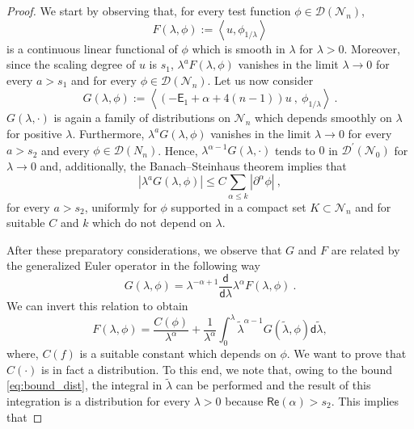 \documentclass[11pt]{book}
\renewcommand{\Re}{\mathsf{Re}}
\newcommand{\abs}[1]{\left|#1\right|}
\newcommand{\sm}[1]{\left\langle#1\right\rangle}
\newcommand{\Dcal}{\mathcal{D}}
\newcommand{\Ncal}{\mathcal{N}}
\newcommand{\Esf}{\mathsf{E}}
\newcommand{\dsf}{\mathsf{d}}
\theoremstyle{break}
\begin{document}
\begin{proof}
We start by observing that, for every test function $\phi\in\Dcal(\Ncal_n)$, 
%
\begin{equation*}
F(\lambda, \phi) := \sm{ u, \phi_{1/\lambda} } 
\end{equation*}
% 
is a continuous linear functional of $\phi$ which is smooth in $\lambda$ for $\lambda>0$. Moreover, since the scaling degree of $u$ is $s_1$, $\lambda^{a} F(\lambda, \phi)$ vanishes in the limit $\lambda \to 0$ for every $a > s_1$ and for every $\phi\in\Dcal(\Ncal_n)$. Let us now consider 
%
\begin{equation*}
G(\lambda, \phi) :=  \sm{\left(- \Esf_1+\alpha+4(n-1)\right) u \ , \ \phi_{1/\lambda} } \ .
\end{equation*}
%
$G(\lambda, \cdot)$ is again a family of distributions on $\Ncal_n$ which depends smoothly on $\lambda$ for positive $\lambda$. Furthermore, $\lambda^a G(\lambda, \phi)$ vanishes in the limit $\lambda \to 0$ for every $a > s_2$ and every $\phi\in\Dcal(N_n)$. Hence, $\lambda^{\alpha-1} G(\lambda, \cdot)$ tends to $0$ in $\Dcal^\prime(\Ncal_0)$ for $\lambda\to 0$ and, additionally, the Banach--Steinhaus theorem \cite{BOURBAKI_1987} implies that 
%
\begin{equation}
\abs{ \lambda^a G(\lambda,\phi) }  \leq C \sum_{\alpha\leq k} \abs{\partial^{\alpha} \phi} \ ,
\label{eq:bound_dist}
\end{equation}
%
for every $a>s_2$, uniformly for $\phi$ supported in a compact set $K\subset \Ncal_n$ and for suitable $C$ and $k$ which do not depend on $\lambda$.\par%
%
After these preparatory considerations, we observe that $G$ and $F$ are related by the generalized Euler operator in the following way
%
\begin{equation*}
G(\lambda, \phi) =  \lambda^{-\alpha+1} \frac{\dsf}{\dsf\lambda} \lambda^{\alpha} F(\lambda, \phi) \ . 
\end{equation*}
%
We can invert this relation to obtain
%
\begin{equation*}
F(\lambda, \phi) =  \frac{C(\phi)}{\lambda^{\alpha}} + \frac{1}{\lambda^\alpha} \int_0^\lambda  \tilde{\lambda}^{\alpha-1} G(\tilde{\lambda}, \phi) \dsf\tilde{\lambda}, 
\end{equation*}
%
where, $C(f)$ is a suitable constant which depends on $\phi$. We want to prove that $C(\cdot)$ is in fact a distribution. To this end, we note that, owing to the bound \eqref{eq:bound_dist}, the integral in $\tilde\lambda$ can be performed and the result of this integration is a distribution for every $\lambda > 0$ because $\Re(\alpha) > s_2$. This implies that 

\end{proof}
\end{document}

